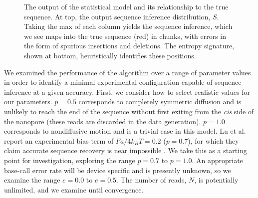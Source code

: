 \documentclass{biophys_letter}
\begin{document}
\begin{figure}
  \caption{The output of the statistical model and its relationship to the true sequence. At top, the output sequence inference distribution, $S$. Taking the max of each column yields the sequence inference, which we see maps into the true sequence (red) in chunks, with errors in the form of spurious insertions and deletions. The entropy signature, shown at bottom, heuristically identifies these positions.}
\label{fig:inference_output}
\end{figure}

We examined the performance of the algorithm over a range of parameter values in order to identify a minimal experimental configuration capable of sequence inference at a given accuracy.
First, we consider how to select realistic values for our parameters.
$p=0.5$ corresponds to completely symmetric diffusion and is unlikely to reach the end of the sequence without first exiting from the {\it cis} side of the nanopore (these reads are discarded in the data generation).
$p=1.0$ corresponds to nondiffusive motion and is a trivial case in this model.
Lu et al. report an experimental bias term of $Fa/4k_{B}T=0.2$ ($p=0.7$), for which they claim accurate sequence recovery is near impossible \cite{Lu:2011}.
We take this as a starting point for investigation, exploring the range $p=0.7$ to $p=1.0$.
An appropriate base-call error rate will be device specific and is presently unknown, so we examine the range $e=0.0$ to $e=0.5$.
The number of reads, $N$, is potentially unlimited, and we examine until convergence.
\end{document}
